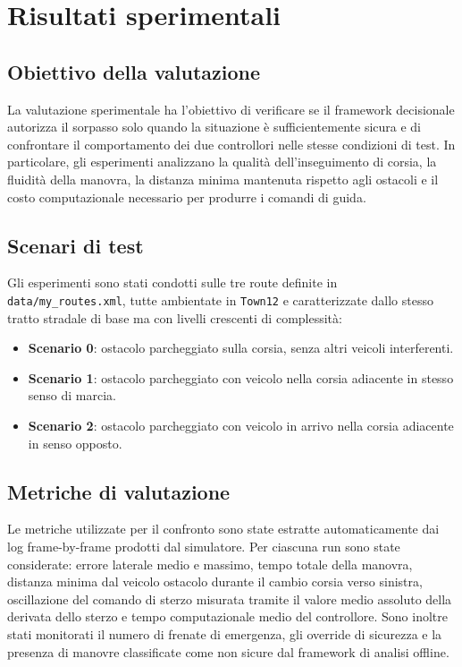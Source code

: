 \chapter{Risultati sperimentali}

\section{Obiettivo della valutazione}

La valutazione sperimentale ha l'obiettivo di verificare se il framework decisionale autorizza il sorpasso solo quando la situazione è sufficientemente sicura e di confrontare il comportamento dei due controllori nelle stesse condizioni di test. In particolare, gli esperimenti analizzano la qualità dell'inseguimento di corsia, la fluidità della manovra, la distanza minima mantenuta rispetto agli ostacoli e il costo computazionale necessario per produrre i comandi di guida.

\section{Scenari di test}

Gli esperimenti sono stati condotti sulle tre route definite in \texttt{data/my\_routes.xml}, tutte ambientate in \texttt{Town12} e caratterizzate dallo stesso tratto stradale di base ma con livelli crescenti di complessità:

\begin{itemize}
\item \textbf{Scenario 0}: ostacolo parcheggiato sulla corsia, senza altri veicoli interferenti.
\item \textbf{Scenario 1}: ostacolo parcheggiato con veicolo nella corsia adiacente in stesso senso di marcia.
\item \textbf{Scenario 2}: ostacolo parcheggiato con veicolo in arrivo nella corsia adiacente in senso opposto.
\end{itemize}



\section{Metriche di valutazione}

Le metriche utilizzate per il confronto sono state estratte automaticamente dai log frame-by-frame prodotti dal simulatore. Per ciascuna run sono state considerate: errore laterale medio e massimo, tempo totale della manovra, distanza minima dal veicolo ostacolo durante il cambio corsia verso sinistra, oscillazione del comando di sterzo misurata tramite il valore medio assoluto della derivata dello sterzo e tempo computazionale medio del controllore. Sono inoltre stati monitorati il numero di frenate di emergenza, gli override di sicurezza e la presenza di manovre classificate come non sicure dal framework di analisi offline.

